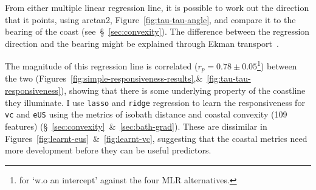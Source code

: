 






\label{sec:angle}

From either multiple linear regression line,
it is possible to work out the
direction that it points, using arctan2,
Figure~\ref{fig:tau-tau-angle}, and compare it to the bearing of the coast (see~§~\ref{sec:convexity}).
The difference between the regression direction and
the bearing might be explained through Ekman transport~\cite{hope2013hindcast}.


\label{sec:reg-metrics}

The magnitude of this regression line is correlated ($r_p=0.78\pm0.05$\footnote{ for `w.o an intercept' against the four MLR alternatives.}) between the two
(Figures~\ref{fig:simple-responsiveness-results},\&~\ref{fig:tau-tau-responsiveness}),
showing that there is some underlying property of the
coastline they illuminate.
 I use \texttt{lasso} and \texttt{ridge} regression
to learn the responsiveness for \texttt{vc} and \texttt{eUS} using the metrics of isobath
distance and coastal convexity (109 features) (§~\ref{sec:convexity}~\&~\ref{sec:bath-grad}).
These are dissimilar in Figures~\ref{fig:learnt-eus}~\&~\ref{fig:learnt-vc},
suggesting that the coastal metrics need more development before they can be
useful predictors.

\label{sec:generalisability}






\FloatBarrier
